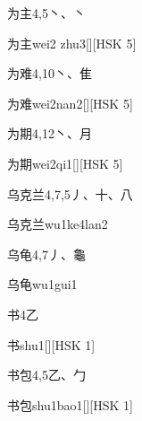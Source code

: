 \begin{entry}{为主}{4,5}{⼂、⼂}
  \begin{phonetics}{为主}{wei2 zhu3}[][HSK 5]
  \end{phonetics}
\end{entry}

\begin{entry}{为难}{4,10}{⼂、⾫}
  \begin{phonetics}{为难}{wei2nan2}[][HSK 5]
  \end{phonetics}
\end{entry}

\begin{entry}{为期}{4,12}{⼂、⽉}
  \begin{phonetics}{为期}{wei2qi1}[][HSK 5]
  \end{phonetics}
\end{entry}

\begin{entry}{乌克兰}{4,7,5}{⼃、⼗、⼋}
  \begin{phonetics}{乌克兰}{wu1ke4lan2}
  \end{phonetics}
\end{entry}

\begin{entry}{乌龟}{4,7}{⼃、⿔}
  \begin{phonetics}{乌龟}{wu1gui1}
  \end{phonetics}
\end{entry}

\begin{entry}{书}{4}{⼄}
  \begin{phonetics}{书}{shu1}[][HSK 1]
  \end{phonetics}
\end{entry}

\begin{entry}{书包}{4,5}{⼄、⼓}
  \begin{phonetics}{书包}{shu1bao1}[][HSK 1]
  \end{phonetics}
\end{entry}

